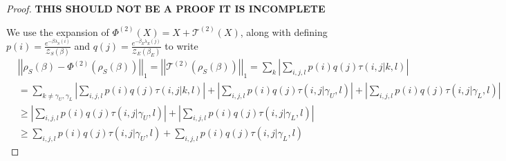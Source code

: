 \documentclass{article}
\newcommand{\abs}[1]{\left| #1 \right|}
\newcommand{\norm}[1]{\left| \left| #1 \right| \right|}
\newcommand{\partfun}{\mathcal{Z}}
\begin{document}
\begin{proof}
\textbf{THIS SHOULD NOT BE A PROOF IT IS INCOMPLETE}


     We use the expansion of $\Phi^{(2)}(X) = X + \mathcal{T}^{(2)} (X)$, along with defining $p(i) = \frac{e^{-\beta \lambda_S(i)}}{\partfun_S(\beta)}$ and $q(j) = \frac{e^{-\beta_E \lambda_E(j)}}{\partfun_E(\beta_E)}$ to write
     \begin{align}
        &\norm{\rho_S(\beta) - \Phi^{(2)} (\rho_S(\beta))}_1 = \norm{\mathcal{T}^{(2)}(\rho_S(\beta))}_1 = \sum_k \abs{\sum_{i,j,l} p(i) q(j) \tau(i,j | k,l)} \\
        &= \sum_{k \neq \gamma_U, \gamma_L} \abs{\sum_{i,j,l} p(i) q(j) \tau(i,j|k,l)} + \abs{\sum_{i,j,l} p(i) q(j) \tau(i,j | \gamma_U, l)} + \abs{\sum_{i,j,l} p(i) q(j) \tau(i,j | \gamma_L, l)} \\
        &\geq \abs{\sum_{i,j,l} p(i) q(j) \tau(i,j | \gamma_U, l)} + \abs{\sum_{i,j,l} p(i) q(j) \tau(i,j | \gamma_L, l)} \\
        &\geq \sum_{i,j,l} p(i) q(j) \tau(i,j | \gamma_U, l) + \sum_{i,j,l} p(i) q(j) \tau(i,j | \gamma_L, l)
     \end{align}
     

\end{proof}
\end{document}
